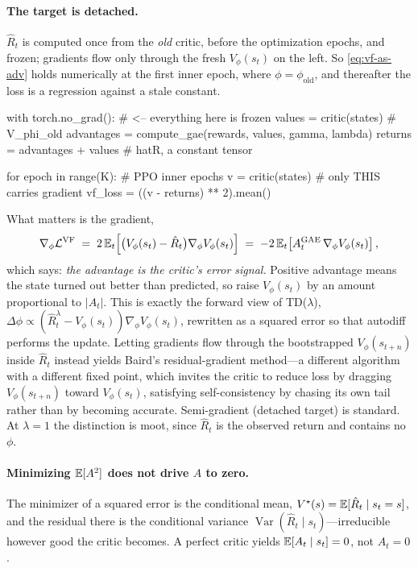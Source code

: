 \paragraph{The target is detached.} $\hat{R}_t$ is computed once from the
\emph{old} critic, before the optimization epochs, and frozen; gradients flow only
through the fresh $V_{\phi}(s_t)$ on the left. So \eqref{eq:vf-as-adv} holds numerically
at the first inner epoch, where $\phi = \phi_{\mathrm{old}}$, and thereafter the
loss is a regression against a stale constant. 
\begin{codeblock}
with torch.no_grad():                            # <-- everything here is frozen
  values     = critic(states)                    # V_{phi_old}
  advantages = compute_gae(rewards, values, gamma, lambda)
  returns    = advantages + values               # hat{R}, a constant tensor

for epoch in range(K):                             # PPO inner epochs
  v = critic(states)                             # only THIS carries gradient
  vf_loss = ((v - returns) ** 2).mean()

\end{codeblock}

What matters is the gradient,
%
\begin{equation}
  \nabla_\phi \mathcal{L}^{\mathrm{VF}}
  \;=\; 2\,\mathbb{E}_t\!\left[\big(V_{\phi}(s_t) - \hat{R}_t\big)\nabla_\phi V_{\phi}(s_t)\right]
  \;=\; -2\,\mathbb{E}_t\!\left[A^{\mathrm{GAE}}_t\,\nabla_\phi V_{\phi}(s_t)\right],
\end{equation}
%
which says: \emph{the advantage is the critic's error signal.} Positive advantage
means the state turned out better than predicted, so raise $V_{\phi}(s_t)$ by an amount
proportional to $|A_t|$. This is exactly the forward view of TD($\lambda$),
$\Delta\phi \propto (\hat{R}^\lambda_t - V_{\phi}(s_t))\nabla_\phi V_{\phi}(s_t)$, rewritten as a
squared error so that autodiff performs the update. Letting gradients flow through
the bootstrapped $V_\phi(s_{t+n})$ inside $\hat{R}_t$ instead yields Baird's
residual-gradient method---a different algorithm with a different fixed point,
which invites the critic to reduce loss by dragging $V_\phi(s_{t+n})$ toward
$V_{\phi}(s_t)$, satisfying self-consistency by chasing its own tail rather than by
becoming accurate. Semi-gradient (detached target) is standard. At $\lambda = 1$
the distinction is moot, since $\hat{R}_t$ is the observed return and contains no
$\phi$.
 
\paragraph{Minimizing $\mathbb{E}[A^2]$ does not drive $A$ to zero.} The minimizer of a
squared error is the conditional mean, $V^\star(s) = \mathbb{E}[\hat{R}_t \mid s_t = s]$,
and the residual there is the conditional variance
$\operatorname{Var}(\hat{R}_t \mid s_t)$---irreducible however good the critic
becomes. A perfect critic yields $\mathbb{E}[A_t \mid s_t] = 0$, not $A_t = 0$.
 
